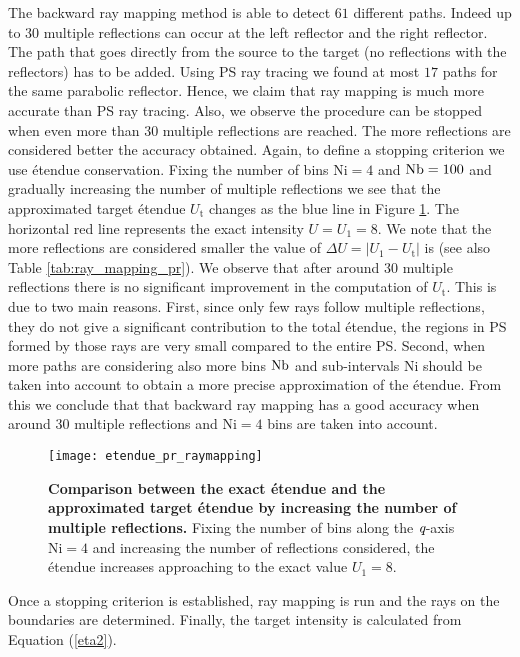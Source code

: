 The backward ray mapping method is able to detect $61$ different paths. Indeed up to $30$ multiple reflections can occur at the left reflector and the right reflector. The path that goes directly from the source to the target (no reflections with the reflectors) has to be added. Using PS ray tracing we found at most $17$ paths for the same parabolic reflector. Hence, we claim that ray mapping is much more accurate than PS ray tracing. Also, we observe the procedure can be stopped when even more than $30$ multiple reflections are reached. The more reflections are considered better the accuracy obtained. Again, to define a stopping criterion we use \'{e}tendue conservation. Fixing the number of bins $\textrm{Ni}=4$ and $\textrm{Nb}=100$ and gradually increasing the number of multiple reflections we see that the approximated target \'{e}tendue $U_{\textrm{t}}$ changes as the blue line in Figure \ref{fig:etendue_pr_raymapping}. The horizontal red line represents the exact intensity $U = U_{1} = 8$. We note that the more reflections are considered smaller the value of $\Delta U = |U_1-U_{\textrm{t}}|$ is (see also Table \ref{tab:ray_mapping_pr}). We observe that after around $30$ multiple reflections there is no significant improvement in the computation of $U_{\textrm{t}}$. This is due to two main reasons. First, since only few rays follow multiple reflections, they do not give a significant contribution to the total \'{e}tendue, the regions in PS formed by those rays are very small compared to the entire PS. Second, when more paths are considering also more bins $\textrm{Nb}$ and sub-intervals $\textrm{Ni}$ should be taken into account to obtain a more precise approximation of the \'{e}tendue. From this we conclude that that backward ray mapping has a good accuracy when around $30$ multiple reflections and $\textrm{Ni}=4$ bins are taken into account.
\begin{figure}[h]
  \begin{center}
  \texttt{[image: etendue\_pr\_raymapping]}
  \end{center}
  \caption{\textbf{Comparison between the exact \'{e}tendue and the approximated target \'{e}tendue by increasing the number of multiple reflections.}
Fixing the number of bins along the $\textit{q}$-axis $\textrm{Ni}=4$ and increasing the number of reflections considered, the \'{e}tendue increases approaching to the exact value $U_1=8$.}
\label{fig:etendue_pr_raymapping}
 \end{figure}
Once a stopping criterion is established, ray mapping is run and the rays on the boundaries are determined. Finally, the target intensity is calculated from Equation (\ref{eta2}). 

